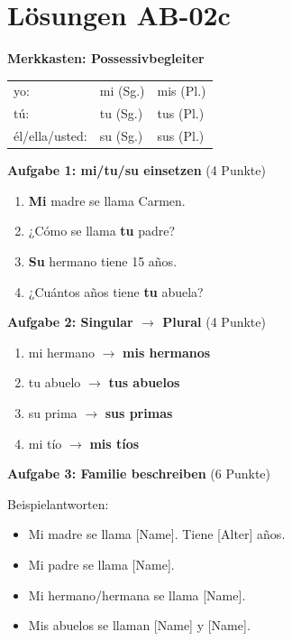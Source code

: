 \documentclass[11pt,a4paper]{article}
\begin{document}
\section{Lösungen AB-02c}

\textbf{Merkkasten: Possessivbegleiter}

\begin{tabular}{lll}
yo: & mi (Sg.) & mis (Pl.) \\
tú: & tu (Sg.) & tus (Pl.) \\
él/ella/usted: & su (Sg.) & sus (Pl.) \\
\end{tabular}

\vspace{1em}

\textbf{Aufgabe 1: mi/tu/su einsetzen} (4 Punkte)
\begin{enumerate}[label=\alph*)]
    \item \textbf{Mi} madre se llama Carmen.
    \item ¿Cómo se llama \textbf{tu} padre?
    \item \textbf{Su} hermano tiene 15 años.
    \item ¿Cuántos años tiene \textbf{tu} abuela?
\end{enumerate}

\vspace{1em}

\textbf{Aufgabe 2: Singular $\rightarrow$ Plural} (4 Punkte)
\begin{enumerate}[label=\alph*)]
    \item mi hermano $\rightarrow$ \textbf{mis hermanos}
    \item tu abuelo $\rightarrow$ \textbf{tus abuelos}
    \item su prima $\rightarrow$ \textbf{sus primas}
    \item mi tío $\rightarrow$ \textbf{mis tíos}
\end{enumerate}

\vspace{1em}

\textbf{Aufgabe 3: Familie beschreiben} (6 Punkte)

Beispielantworten:
\begin{itemize}
    \item Mi madre se llama [Name]. Tiene [Alter] años.
    \item Mi padre se llama [Name].
    \item Mi hermano/hermana se llama [Name].
    \item Mis abuelos se llaman [Name] y [Name].
\end{itemize}
\end{document}
